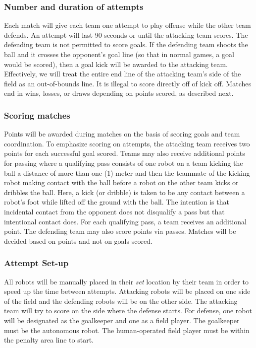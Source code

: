 \subsubsection{Number and duration of attempts}
Each match will give each team one attempt to play offense while the other team defends. An attempt will last 90 seconds or until the attacking team scores. The defending team is not permitted to score goals. If the defending team shoots the ball and it crosses the opponent’s goal line (so that in normal games, a goal would be scored), then a goal kick will be awarded to the attacking team. Effectively, we will treat the entire end line of the attacking team's side of the field as an out-of-bounds line. It is illegal to score directly off of kick off. Matches end in wins, losses, or draws depending on points scored, as described next. 

\subsubsection{Scoring matches}
Points will be awarded during matches on the basis of scoring goals and team coordination. To emphasize scoring on attempts, the attacking team receives two points for each successful goal scored. Teams may also receive additional points for passing where a qualifying pass consists of one robot on a team kicking the ball a distance of more than one (1) meter and then the teammate of the kicking robot making contact with the ball before a robot on the other team kicks or dribbles the ball. Here, a kick (or dribble) is taken to be any contact between a robot's foot while lifted off the ground with the ball. The intention is that incidental contact from the opponent does not disqualify a pass but that intentional contact does. For each qualifying pass, a team receives an additional point. The defending team may also score points via passes. Matches will be decided based on points and not on goals scored.

\subsubsection{Attempt Set-up}
All robots will be manually placed in their \textit{set} location by their team in order to speed up the time between attempts.  Attacking robots will be placed on one side of the field and the defending robots will be on the other side. The attacking team will try to score on the side where the defense starts. For defense, one robot will be designated as the goalkeeper and one as a field player. The goalkeeper must be the autonomous robot. The human-operated field player must be within the penalty area line to start.


